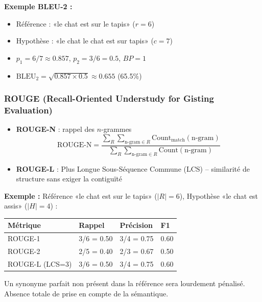 \documentclass[a4paper,10pt]{article}
\begin{document}
\textbf{Exemple BLEU-2 :}
\begin{itemize}
  \item Référence : «le chat est sur le tapis» ($r=6$)
  \item Hypothèse : «le chat le chat est sur tapis» ($c=7$)
  \item $p_1 = 6/7 \approx 0.857$, $p_2 = 3/6 = 0.5$, $BP = 1$
  \item $\text{BLEU}_2 = \sqrt{0.857 \times 0.5} \approx 0.655$ (65.5\%)
\end{itemize}

\subsubsection{ROUGE (Recall-Oriented Understudy for Gisting Evaluation)}

\begin{definitionbox}
\begin{itemize}
  \item \textbf{ROUGE-N} : rappel des $n$-grammes
  \[
  \text{ROUGE-N} = \frac{\sum_R \sum_{\text{n-gram} \in R} \text{Count}_{\text{match}}(\text{n-gram})}{\sum_R \sum_{\text{n-gram} \in R} \text{Count}(\text{n-gram})}
  \]
  \item \textbf{ROUGE-L} : Plus Longue Sous-Séquence Commune (LCS) -- similarité de structure sans exiger la contiguïté
\end{itemize}
\end{definitionbox}

\textbf{Exemple :} Référence «le chat est sur le tapis» ($|R|=6$), Hypothèse «le chat est assis» ($|H|=4$) :
\begin{center}
\small
\begin{tabular}{llll}
\toprule
\textbf{Métrique} & \textbf{Rappel} & \textbf{Précision} & \textbf{F1} \\
\midrule
ROUGE-1 & 3/6 = 0.50 & 3/4 = 0.75 & 0.60 \\
ROUGE-2 & 2/5 = 0.40 & 2/3 = 0.67 & 0.50 \\
ROUGE-L (LCS=3) & 3/6 = 0.50 & 3/4 = 0.75 & 0.60 \\
\bottomrule
\end{tabular}
\end{center}

\begin{warningbox}
Un synonyme parfait non présent dans la référence sera lourdement pénalisé. Absence totale de prise en compte de la sémantique.
\end{warningbox}
\end{document}
